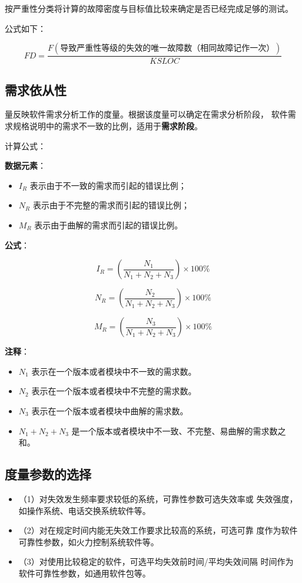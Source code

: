 按严重性分类将计算的故障密度与目标值比较来确定是否已经完成足够的测试。

公式如下：

\[
 FD = \frac{F(\text{导致严重性等级的失效的唯一故障数（相同故障记作一次）})}{KSLOC}
\]

\subsection{需求依从性}

量反映软件需求分析工作的度量。根据该度量可以确定在需求分析阶段，
软件需求规格说明中的需求不一致的比例，适用于\textbf{需求阶段}。

计算公式：


\textbf{数据元素}：
\begin{itemize}
    \item $I_R$ 表示由于不一致的需求而引起的错误比例；
    \item $N_R$ 表示由于不完整的需求而引起的错误比例；
    \item $M_R$ 表示由于曲解的需求而引起的错误比例。
\end{itemize}

\textbf{公式}：

\[
I_R = \left( \frac{N_1}{N_1 + N_2 + N_3} \right) \times 100\%
\]

\[
N_R = \left( \frac{N_2}{N_1 + N_2 + N_3} \right) \times 100\%
\]

\[
M_R = \left( \frac{N_3}{N_1 + N_2 + N_3} \right) \times 100\%
\]

\textbf{注释}：
\begin{itemize}
    \item $N_1$ 表示在一个版本或者模块中不一致的需求数。
    \item $N_2$ 表示在一个版本或者模块中不完整的需求数。
    \item $N_3$ 表示在一个版本或者模块中曲解的需求数。
    \item $N_1 + N_2 + N_3$ 是一个版本或者模块中不一致、不完整、易曲解的需求数之和。
\end{itemize}

\subsection{度量参数的选择}

\begin{itemize}
  \item （1）对失效发生频率要求较低的系统，可靠性参数可选失效率或
  失效强度，如操作系统、电话交换系统软件等。
  \item（2）对在规定时间内能无失效工作要求比较高的系统，可选可靠
  度作为软件可靠性参数，如火力控制系统软件等。
  \item（3）对使用比较稳定的软件，可选平均失效前时间/平均失效间隔
  时间作为软件可靠性参数，如通用软件包等。
\end{itemize}

